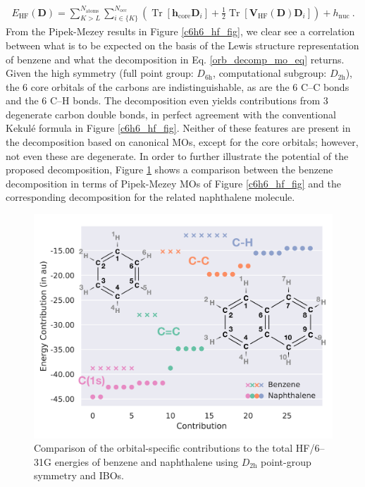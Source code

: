 \documentclass[journal=jctc,manuscript=article]{achemso}
\DeclareMathOperator{\tr}{Tr}
\begin{document}
%
\begin{align}
E_{\text{HF}}(\bm{D}) = \sum^{N_{\text{atoms}}}_{K>L}\sum^{N_{\text{occ}}}_{i \in \{K\}}(\tr[\bm{h}_{\text{core}}\bm{D}_i] + \tfrac{1}{2}\tr[\bm{V}_{\text{HF}}(\bm{D})\bm{D}_i]) + h_{\text{nuc}} \ . \label{orb_decomp_bond_eq}
\end{align}
%
From the Pipek-Mezey results in Figure \ref{c6h6_hf_fig}, we clear see a correlation between what is to be expected on the basis of the Lewis structure representation of benzene and what the decomposition in Eq. \ref{orb_decomp_mo_eq} returns. Given the high symmetry (full point group: $D_{6\text{h}}$, computational subgroup: $D_{2\text{h}}$), the 6 core orbitals of the carbons are indistinguishable, as are the 6 C--C bonds and the 6 C--H bonds. The decomposition even yields contributions from 3 degenerate carbon double bonds, in perfect agreement with the conventional Kekul{\'e} formula in Figure \ref{c6h6_hf_fig}. Neither of these features are present in the decomposition based on canonical MOs, except for the core orbitals; however, not even these are degenerate. In order to further illustrate the potential of the proposed decomposition, Figure \ref{c10h8_hf_fig} shows a comparison between the benzene decomposition in terms of Pipek-Mezey MOs of Figure \ref{c6h6_hf_fig} and the corresponding decomposition for the related naphthalene molecule.\\
%
\begin{figure}[ht]
\begin{center}
\includegraphics[width=\textwidth]{figures/c6h6_c10h8_hf_2.pdf}
\caption{Comparison of the orbital-specific contributions to the total HF/6--31G energies of benzene and naphthalene using $D_{2\text{h}}$ point-group symmetry and IBOs.}
\label{c10h8_hf_fig}
\end{center}
\end{figure}
%
\end{document}
